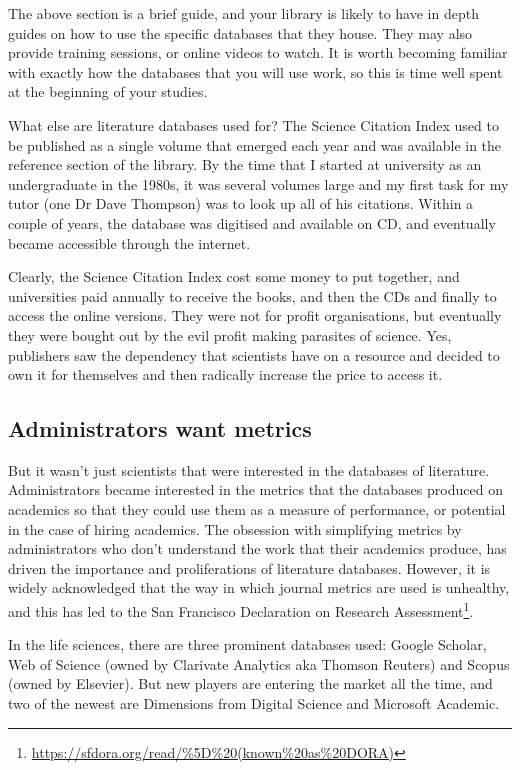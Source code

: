 \documentclass[
]{krantz}
\renewcommand{\href}[2]{#2\footnote{\url{#1}}}
\begin{document}
The above section is a brief guide, and your library is likely to have in depth guides on how to use the specific databases that they house. They may also provide training sessions, or online videos to watch. It is worth becoming familiar with exactly how the databases that you will use work, so this is time well spent at the beginning of your studies.

What else are literature databases used for?
The Science Citation Index used to be published as a single volume that emerged each year and was available in the reference section of the library. By the time that I started at university as an undergraduate in the 1980s, it was several volumes large and my first task for my tutor (one Dr Dave Thompson) was to look up all of his citations. Within a couple of years, the database was digitised and available on CD, and eventually became accessible through the internet.

Clearly, the Science Citation Index cost some money to put together, and universities paid annually to receive the books, and then the CDs and finally to access the online versions. They were not for profit organisations, but eventually they were bought out by the evil profit making parasites of science. Yes, publishers saw the dependency that scientists have on a resource and decided to own it for themselves and then radically increase the price to access it.

\hypertarget{administrators-want-metrics}{%
\subsection{Administrators want metrics}\label{administrators-want-metrics}}

But it wasn't just scientists that were interested in the databases of literature. Administrators became interested in the metrics that the databases produced on academics so that they could use them as a measure of performance, or potential in the case of hiring academics. The obsession with simplifying metrics by administrators who don't understand the work that their academics produce, has driven the importance and proliferations of literature databases. However, it is widely acknowledged that the way in which journal metrics are used is unhealthy, and this has led to the \href{https://sfdora.org/read/\%5D\%20(known\%20as\%20DORA)}{San Francisco Declaration on Research Assessment}.

In the life sciences, there are three prominent databases used: Google Scholar, Web of Science (owned by Clarivate Analytics aka Thomson Reuters) and Scopus (owned by Elsevier). But new players are entering the market all the time, and two of the newest are Dimensions from Digital Science and Microsoft Academic.
\end{document}

